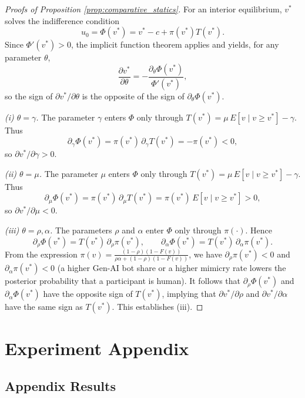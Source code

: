 \documentclass[12pt,notitlepage]{article}
\theoremstyle{plain}
\theoremstyle{plain}
\theoremstyle{definition}
\theoremstyle{definition}
\theoremstyle{assumption}
\theoremstyle{plain}
\theoremstyle{plain}
\theoremstyle{plain}
\theoremstyle{plain}
\theoremstyle{definition}%
\theoremstyle{plain}
\theoremstyle{plain}
\theoremstyle{plain}
\theoremstyle{plain}
\begin{document}
\begin{proof}[Proofs of Proposition \ref{prop:comparative_statics}]
    For an interior equilibrium, $v^*$ solves the indifference condition
    \[
    u_0=\Phi(v^*)=v^*-c+\pi(v^*)T(v^*).
    \]
    Since $\Phi'(v^*)>0$, the implicit function theorem applies and yields, for any parameter $\theta$,
    \[
    \frac{\partial v^*}{\partial \theta}=-\frac{\partial_\theta\Phi(v^*)}{\Phi'(v^*)},
    \]
    so the sign of $\partial v^*/\partial\theta$ is the opposite of the sign of $\partial_\theta\Phi(v^*)$.


    \emph{(i) $\theta=\gamma$.} The parameter $\gamma$ enters $\Phi$ only through $T(v^*)=\mu\,E[v\mid v\ge v^*]-\gamma$. Thus
    \[
    \partial_\gamma\Phi(v^*)=\pi(v^*)\,\partial_\gamma T(v^*)=-\pi(v^*)<0,
    \]
    so $\partial v^*/\partial\gamma>0$.
    
    \emph{(ii) $\theta=\mu$.} The parameter $\mu$ enters $\Phi$ only through $T(v^*)=\mu\,E[v\mid v\ge v^*]-\gamma$. Thus
    \[
    \partial_\mu\Phi(v^*)=\pi(v^*)\,\partial_\mu T(v^*)=\pi(v^*)\,E[v\mid v\ge v^*]>0,
    \]
    so $\partial v^*/\partial\mu<0$.
    

    \emph{(iii) $\theta = \rho,\alpha$.} The parameters $\rho$ and $\alpha$ enter $\Phi$ only through $\pi(\cdot)$. Hence
    \[
    \partial_\rho\Phi(v^*)=T(v^*)\,\partial_\rho\pi(v^*),\qquad
    \partial_\alpha\Phi(v^*)=T(v^*)\,\partial_\alpha\pi(v^*).
    \]
    From the expression $\pi(v) = \frac{(1-\rho)(1-F(v))}{\rho \alpha + (1-\rho)(1-F(v))}$, we have $\partial_\rho\pi(v^*)<0$ and $\partial_\alpha\pi(v^*)<0$ (a higher Gen-AI bot share or a higher mimicry rate lowers the posterior probability that a participant is human). It follows that $\partial_\rho\Phi(v^*)$ and $\partial_\alpha\Phi(v^*)$ have the opposite sign of $T(v^*)$, implying that $\partial v^*/\partial\rho$ and $\partial v^*/\partial \alpha$ have the same sign as $T(v^*)$. This establishes (iii).
\end{proof}


\clearpage

\section{Experiment Appendix\label{app:Design}}

\subsection{Appendix Results \label{sec:app_results}}
\end{document}
